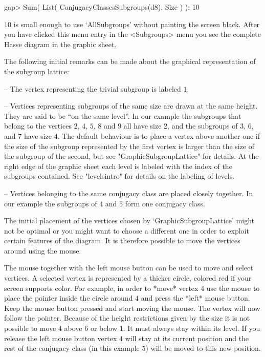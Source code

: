 \begintt
    gap> Sum( List( ConjugacyClassesSubgroups(d8), Size ) );
    10 
\endtt

$10$ is small enough to use `AllSubgroups' without painting the screen
black.  After you have clicked this menu entry in the <Subgroups> menu you
see the complete Hasse diagram in the graphic sheet.

The   following initial  remarks  can    be  made  about  the   graphical
representation of the subgroup lattice:

\beginlist
\item{--} The vertex representing the trivial subgroup is labeled $1$.
  
\item{--} Vertices representing subgroups of the same size are drawn at the
  same height. They are said to be ``on the same level''.  In our example
  the subgroups that belong to the vertices $2$, $4$, $5$, $8$ and $9$ all
  have size 2, and the subgroups of $3$, $6$, and $7$ have size $4$. The
  default behaviour is to place a vertex above another one if the size of
  the subgroup represented by the first vertex is larger than the size of
  the subgroup of the second, but see "GraphicSubgroupLattice" for details. At
  the right edge of the graphic sheet each level is labeled with the index
  of the subgroups contained. See "levelsintro" for details on the
  labeling of levels.
  
\item{--} Vertices belonging to the same conjugacy class are placed closely
  together.  In our example the subgroups of $4$ and $5$ form one conjugacy
  class.
\endlist

The initial placement of the vertices chosen by `GraphicSubgroupLattice'
might not be optimal or you might want to choose a different one in order
to exploit certain features of the diagram.  It is therefore possible to
move the vertices around using the mouse.

The mouse together with the left mouse button can be used to move and
select vertices. A selected vertex is represented by a thicker circle,
colored red if your screen supports color.  For example, in order to *move*
vertex $4$ use the mouse to place the pointer inside the circle around $4$
and press the *left* mouse button.  Keep the mouse button pressed and start
moving the mouse.  The vertex will now follow the pointer.  Because of the
height restrictions given by the size it is not possible to move $4$ above
$6$ or below $1$. It must always stay within its level. If you release the
left mouse button vertex $4$ will stay at its current position and the rest
of the conjugacy class (in this example $5$) will be moved to this new
position.

